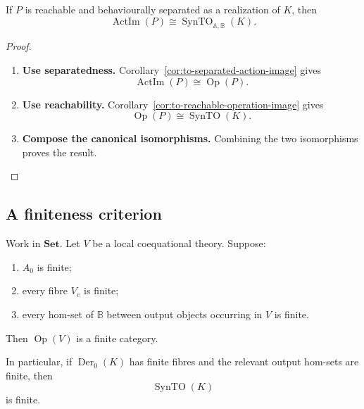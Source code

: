 \begin{corollary}
\label{cor:to-operational-myhill-nerode}
    If \(P\) is reachable and behaviourally separated as a realization of
    \(K\), then
    \[
        \operatorname{ActIm}(P)
        \cong
        \operatorname{SynTO}_{\mathbb A,\mathbb B}(K).
    \]
\end{corollary}

\begin{proof}
    \leavevmode
    \begin{enumerate}
        \item \textbf{Use separatedness.}
        Corollary~\ref{cor:to-separated-action-image} gives
        \[
            \operatorname{ActIm}(P)
            \cong
            \operatorname{Op}(P).
        \]

        \item \textbf{Use reachability.}
        Corollary~\ref{cor:to-reachable-operation-image} gives
        \[
            \operatorname{Op}(P)
            \cong
            \operatorname{SynTO}(K).
        \]

        \item \textbf{Compose the canonical isomorphisms.}
        Combining the two isomorphisms proves the result.
    \end{enumerate}
\end{proof}

\subsection{A finiteness criterion}
\label{subsec:to-finiteness-criterion}

\begin{proposition}
\label{prop:to-finiteness-syntactic-category}
    Work in \(\mathbf{Set}\). Let \(V\) be a local coequational theory. Suppose:
    \begin{enumerate}
        \item \(A_0\) is finite;
        \item every fibre \(V_v\) is finite;
        \item every hom-set of \(\mathbb B\) between output objects occurring in
        \(V\) is finite.
    \end{enumerate}
    Then \(\operatorname{Op}(V)\) is a finite category.

    In particular, if \(\operatorname{Der}_0(K)\) has finite fibres and the
    relevant output hom-sets are finite, then
    \[
        \operatorname{SynTO}(K)
    \]
    is finite.
\end{proposition}

